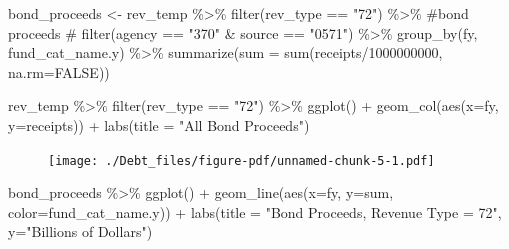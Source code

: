 \documentclass[
  letterpaper,
  DIV=11,
  numbers=noendperiod]{scrreport}
\newenvironment{Shaded}{\begin{snugshade}}{\end{snugshade}}
\newcommand{\AttributeTok}[1]{\textcolor[rgb]{0.40,0.45,0.13}{#1}}
\newcommand{\CommentTok}[1]{\textcolor[rgb]{0.37,0.37,0.37}{#1}}
\newcommand{\ConstantTok}[1]{\textcolor[rgb]{0.56,0.35,0.01}{#1}}
\newcommand{\DecValTok}[1]{\textcolor[rgb]{0.68,0.00,0.00}{#1}}
\newcommand{\FunctionTok}[1]{\textcolor[rgb]{0.28,0.35,0.67}{#1}}
\newcommand{\NormalTok}[1]{\textcolor[rgb]{0.00,0.23,0.31}{#1}}
\newcommand{\OtherTok}[1]{\textcolor[rgb]{0.00,0.23,0.31}{#1}}
\newcommand{\SpecialCharTok}[1]{\textcolor[rgb]{0.37,0.37,0.37}{#1}}
\newcommand{\StringTok}[1]{\textcolor[rgb]{0.13,0.47,0.30}{#1}}
\begin{document}
\begin{Shaded}
\begin{Highlighting}[]
\NormalTok{bond\_proceeds }\OtherTok{\textless{}{-}}\NormalTok{ rev\_temp }\SpecialCharTok{\%\textgreater{}\%} 
  \FunctionTok{filter}\NormalTok{(rev\_type }\SpecialCharTok{==} \StringTok{"72"}\NormalTok{) }\SpecialCharTok{\%\textgreater{}\%} \CommentTok{\#bond proceeds}
\CommentTok{\#  filter(agency == "370" \& source == "0571") \%\textgreater{}\%     }
  \FunctionTok{group\_by}\NormalTok{(fy, fund\_cat\_name.y) }\SpecialCharTok{\%\textgreater{}\%} 
  \FunctionTok{summarize}\NormalTok{(}\AttributeTok{sum =} \FunctionTok{sum}\NormalTok{(receipts}\SpecialCharTok{/}\DecValTok{1000000000}\NormalTok{, }\AttributeTok{na.rm=}\ConstantTok{FALSE}\NormalTok{))}

\NormalTok{rev\_temp }\SpecialCharTok{\%\textgreater{}\%} \FunctionTok{filter}\NormalTok{(rev\_type }\SpecialCharTok{==} \StringTok{"72"}\NormalTok{) }\SpecialCharTok{\%\textgreater{}\%} \FunctionTok{ggplot}\NormalTok{() }\SpecialCharTok{+} \FunctionTok{geom\_col}\NormalTok{(}\FunctionTok{aes}\NormalTok{(}\AttributeTok{x=}\NormalTok{fy, }\AttributeTok{y=}\NormalTok{receipts)) }\SpecialCharTok{+} \FunctionTok{labs}\NormalTok{(}\AttributeTok{title =} \StringTok{"All Bond Proceeds"}\NormalTok{)}
\end{Highlighting}
\end{Shaded}

\begin{figure}[H]

{\centering \texttt{[image: ./Debt\_files/figure-pdf/unnamed-chunk-5-1.pdf]}

}

\end{figure}

\begin{Shaded}
\begin{Highlighting}[]
\NormalTok{bond\_proceeds }\SpecialCharTok{\%\textgreater{}\%} \FunctionTok{ggplot}\NormalTok{() }\SpecialCharTok{+} 
  \FunctionTok{geom\_line}\NormalTok{(}\FunctionTok{aes}\NormalTok{(}\AttributeTok{x=}\NormalTok{fy, }\AttributeTok{y=}\NormalTok{sum, }\AttributeTok{color=}\NormalTok{fund\_cat\_name.y)) }\SpecialCharTok{+} 
  \FunctionTok{labs}\NormalTok{(}\AttributeTok{title =} \StringTok{"Bond Proceeds, Revenue Type = 72"}\NormalTok{, }\AttributeTok{y=}\StringTok{"Billions of Dollars"}\NormalTok{)}
\end{Highlighting}
\end{Shaded}
\end{document}

